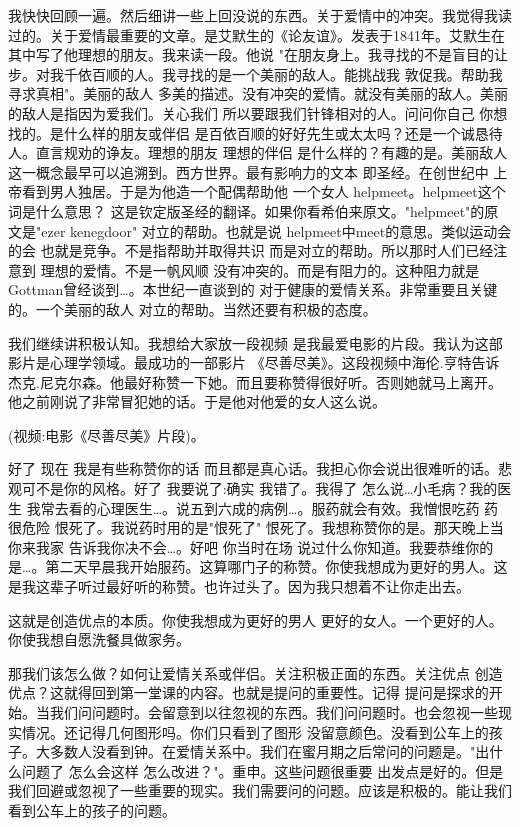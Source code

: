 我快快回顾一遍。然后细讲一些上回没说的东西。关于爱情中的冲突。我觉得我读过的。关于爱情最重要的文章。是艾默生的《论友谊》。发表于1841年。艾默生在其中写了他理想的朋友。我来读一段。他说 "在朋友身上。我寻找的不是盲目的让步。对我千依百顺的人。我寻找的是一个美丽的敌人。能挑战我 敦促我。帮助我寻求真相"。美丽的敌人 多美的描述。没有冲突的爱情。就没有美丽的敌人。美丽的敌人是指因为爱我们。关心我们 所以要跟我们针锋相对的人。问问你自己 你想找的。是什么样的朋友或伴侣 是百依百顺的好好先生或太太吗？还是一个诚恳待人。直言规劝的诤友。理想的朋友 理想的伴侣 是什么样的？有趣的是。美丽敌人这一概念最早可以追溯到。西方世界。最有影响力的文本 即圣经。在创世纪中 上帝看到男人独居。于是为他造一个配偶帮助他 一个女人 helpmeet。helpmeet这个词是什么意思？ 这是钦定版圣经的翻译。如果你看希伯来原文。"helpmeet"的原文是"ezer kenegdoor" 对立的帮助。也就是说 helpmeet中meet的意思。类似运动会的会 也就是竞争。不是指帮助并取得共识 而是对立的帮助。所以那时人们已经注意到 理想的爱情。不是一帆风顺 没有冲突的。而是有阻力的。这种阻力就是Gottman曾经谈到…。本世纪一直谈到的 对于健康的爱情关系。非常重要且关键的。一个美丽的敌人 对立的帮助。当然还要有积极的态度。 

我们继续讲积极认知。我想给大家放一段视频 是我最爱电影的片段。我认为这部影片是心理学领域。最成功的一部影片 《尽善尽美》。这段视频中海伦.亨特告诉杰克.尼克尔森。他最好称赞一下她。而且要称赞得很好听。否则她就马上离开。他之前刚说了非常冒犯她的话。于是他对他爱的女人这么说。 

(视频:电影《尽善尽美》片段)。 

好了 现在 我是有些称赞你的话 而且都是真心话。我担心你会说出很难听的话。悲观可不是你的风格。好了 我要说了:确实 我错了。我得了 怎么说…小毛病？我的医生 我常去看的心理医生…。说五到六成的病例…。服药就会有效。我憎恨吃药 药很危险 恨死了。我说药时用的是"恨死了" 恨死了。我想称赞你的是。那天晚上当你来我家 告诉我你决不会…。好吧 你当时在场 说过什么你知道。我要恭维你的是…。第二天早晨我开始服药。这算哪门子的称赞。你使我想成为更好的男人。这是我这辈子听过最好听的称赞。也许过头了。因为我只想着不让你走出去。 

这就是创造优点的本质。你使我想成为更好的男人 更好的女人。一个更好的人。你使我想自愿洗餐具做家务。 

那我们该怎么做？如何让爱情关系或伴侣。关注积极正面的东西。关注优点 创造优点？这就得回到第一堂课的内容。也就是提问的重要性。记得 提问是探求的开始。当我们问问题时。会留意到以往忽视的东西。我们问问题时。也会忽视一些现实情况。还记得几何图形吗。你们只看到了图形 没留意颜色。没看到公车上的孩子。大多数人没看到钟。在爱情关系中。我们在蜜月期之后常问的问题是。"出什么问题了 怎么会这样 怎么改进？"。重申。这些问题很重要 出发点是好的。但是我们回避或忽视了一些重要的现实。我们需要问的问题。应该是积极的。能让我们看到公车上的孩子的问题。 

